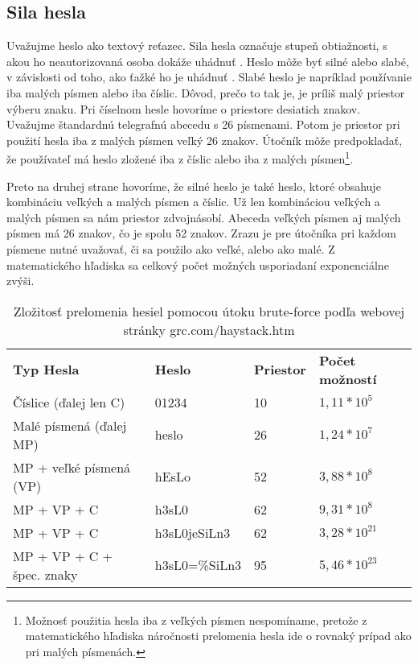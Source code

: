 \subsection{Sila hesla} 
\label{silahesla}
Uvažujme heslo ako textový reťazec. Sila hesla označuje stupeň obtiažnosti, s akou ho neautorizovaná osoba dokáže uhádnuť \cite{sila_hesla}. Heslo môže byť silné alebo slabé, v závislosti od toho, ako ťažké ho je uhádnuť \cite{sila_hesla}. Slabé heslo je napríklad používanie iba malých písmen alebo iba číslic. Dôvod, prečo to tak je, je príliš malý priestor výberu znaku. Pri číselnom hesle hovoríme o priestore desiatich znakov. Uvažujme štandardnú telegrafnú abecedu s 26 písmenami. Potom je priestor pri použití hesla iba z malých písmen veľký 26 znakov. Útočník môže predpokladať, že používateľ má heslo zložené iba z číslic alebo iba z malých písmen\footnote{Možnosť použitia hesla iba z veľkých písmen nespomíname, pretože z matematického hľadiska náročnosti prelomenia hesla ide o rovnaký prípad ako pri malých písmenách.}.

Preto na druhej strane hovoríme, že silné heslo je také heslo, ktoré obsahuje kombináciu veľkých a malých písmen a číslic. Už len kombináciou veľkých a malých písmen sa nám priestor zdvojnásobí. Abeceda veľkých písmen aj malých písmen má 26 znakov, čo je spolu 52 znakov. Zrazu je pre útočníka pri každom písmene nutné uvažovať, či sa použilo ako veľké, alebo ako malé. Z matematického hľadiska sa celkový počet možných usporiadaní exponenciálne zvýši.


\begin{table}[ht]
\caption{Zložitosť prelomenia hesiel pomocou útoku brute-force podľa webovej stránky grc.com/haystack.htm}
\label{table:1}
\begin{tabular}{llll}
\textbf{Typ Hesla}        & \textbf{Heslo} & \textbf{Priestor} & \textbf{Počet možností} \\
Číslice (ďalej len C)     & 01234          & 10                & $1,11*10^5$             \\
Malé písmená (ďalej MP)   & heslo          & 26                & $1,24*10^7$             \\
MP + veľké písmená (VP)   & hEsLo          & 52                & $3,88*10^8$             \\
MP + VP + C               & h3sL0          & 62                & $9,31*10^8$             \\
MP + VP + C				  & h3sL0jeSiLn3   & 62				   & $3,28*10^{21}$			 \\
MP + VP + C + špec. znaky & h3sL0=\%SiLn3  & 95                & $5,46*10^{23}$           
\end{tabular}
\end{table}

